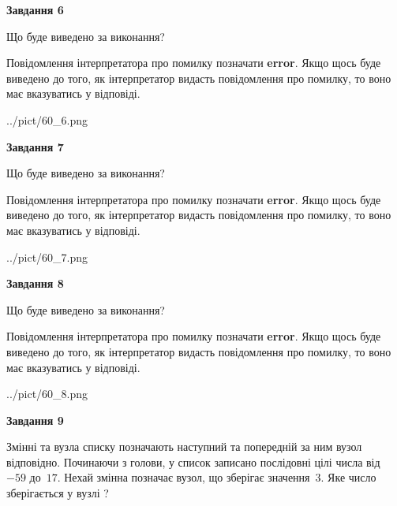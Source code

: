 \documentclass[12pt, ukrainian]{article}
\begin{document}
{\begin {large}
{\begin {center}\textbf{Завдання 6}\end {center}}\par
Що буде виведено за виконання?

Повідомлення інтерпретатора про помилку позначати \textbf{error}.
Якщо щось буде виведено до того, як інтерпретатор видасть повідомлення про помилку, 
то воно має вказуватись у відповіді. \par


\begin{center}
	{../pict/60_6.png}
\end{center}
\newpage

{\begin {center}\textbf{Завдання 7}\end {center}}\par
Що буде виведено за виконання?

Повідомлення інтерпретатора про помилку позначати \textbf{error}.
Якщо щось буде виведено до того, як інтерпретатор видасть повідомлення про помилку, 
то воно має вказуватись у відповіді. \par


\begin{center}
	{../pict/60_7.png}
\end{center}
\newpage

{\begin {center}\textbf{Завдання 8}\end {center}}\par
Що буде виведено за виконання?

Повідомлення інтерпретатора про помилку позначати \textbf{error}.
Якщо щось буде виведено до того, як інтерпретатор видасть повідомлення про помилку, 
то воно має вказуватись у відповіді. \par


\begin{center}
	{../pict/60_8.png}
\end{center}
\newpage

{\begin {center}\textbf{Завдання 9}\end {center}}\par
Змінні  та  вузла списку позначають наступний та попередній за ним вузол відповідно. Починаючи з голови, у список записано послідовні цілі числа від~$-59$ до~$17$. Нехай змінна  позначає вузол, що зберігає значення~$3$.
Яке число зберігається у вузлі  ?\par
\newpage


\end{large}}
\end{document}

